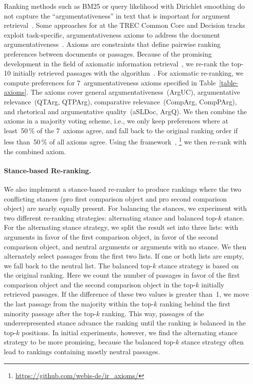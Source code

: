 Ranking methods such as BM25 or query likelihood with Dirichlet smoothing do not capture the ``argumentativeness'' in text that is important for argument retrieval~\cite{BondarenkoFKSGBPBSWPH2022}.
Some approaches for at the TREC Common Core and Decision tracks exploit task-specific, argumentativeness axioms to address the document argumentativeness~\cite{BondarenkoHVSPB2018,BondarenkoFKHVS2019}.
Axioms are constraints that define pairwise ranking preferences between documents or passages.
Because of the promising development in the field of axiomatic information retrieval~\cite{BondarenkoFRSVH2022}, we re-rank the top-10 initially retrieved passages with the \KwikSort algorithm~\cite{HagenVGS2016}.
For axiomatic re-ranking, we compute preferences for 7~argumentativeness axioms specified in Table~\ref{table-axioms}.
The axioms cover general argumentativeness~(ArgUC), argumentative relevance~(QTArg, QTPArg), comparative relevance~(CompArg, CompPArg), and rhetorical and argumentative quality~(aSLDoc, ArgQ).
We then combine the axioms in a majority voting scheme, i.e., we only keep preferences where at least~50\,\% of the 7~axioms agree, and fall back to the original ranking order if less than~50\,\% of all axioms agree.
Using the \iraxioms framework~\cite{BondarenkoFRSVH2022},%
\footnote{\url{https://github.com/webis-de/ir_axioms/}} we then re-rank with the combined axiom.

\paragraph{Stance-based Re-ranking.}

We also implement a stance-based re-ranker to produce rankings where the two conflicting stances (pro first comparison object and pro second comparison object) are nearly equally present.
For balancing the stances, we experiment with two different re-ranking strategies: \Ni alternating stance and \Nii balanced top-\(k\) stance.
For the alternating stance strategy, we split the result set into three lists: \Ni with arguments in favor of the first comparison object, \Nii in favor of the second comparison object, and \Niii neutral arguments or arguments with no stance.
We then alternately select passages from the first two lists. If one or both lists are empty, we fall back to the neutral list.
The balanced top-\(k\) stance strategy is based on the original ranking.
Here we count the number of passages in favor of the first comparison object and the second comparison object in the top-\(k\) initially retrieved passages.
If the difference of these two values is greater than~1, we move the last passage from the majority within the top-\(k\) ranking behind the first minority passage after the top-\(k\) ranking.
This way, passages of the underrepresented stance advance the ranking until the ranking is balanced in the top-\(k\) positions.
In initial experiments, however, we find the alternating stance strategy to be more promising, because the balanced top-\(k\) stance strategy often lead to rankings containing mostly neutral passages.

